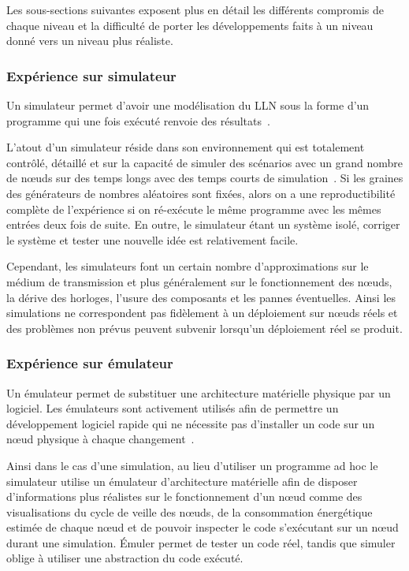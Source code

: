 Les sous-sections suivantes exposent plus en détail les différents compromis de chaque niveau et la difficulté de porter les développements faits à un niveau donné vers un niveau plus réaliste.

\subsubsection{Expérience sur simulateur}
\label{makesense:simulation}

Un simulateur permet d'avoir une modélisation du \ac{LLN} sous la forme d'un programme qui une fois exécuté renvoie des résultats~\cite{sobeih2006j,abdeddaim2011implementation}.

L'atout d'un simulateur réside dans son environnement qui est totalement contrôlé, détaillé et sur la capacité de simuler des scénarios avec un grand nombre de nœuds sur des temps longs avec des temps courts de simulation~\cite{jevtic2009evaluation}.
Si les graines des générateurs de nombres aléatoires sont fixées, alors on a une reproductibilité complète de l'expérience si on ré-exécute le même programme avec les mêmes entrées deux fois de suite.
En outre, le simulateur étant un système isolé, corriger le système et tester une nouvelle idée est relativement facile.

Cependant, les simulateurs font un certain nombre d'approximations sur le médium de transmission et plus généralement sur le fonctionnement des nœuds, la dérive des horloges, l'usure des composants et les pannes éventuelles.
Ainsi les simulations ne correspondent pas fidèlement à un déploiement sur nœuds réels et des problèmes non prévus peuvent subvenir lorsqu'un déploiement réel se produit.

\subsubsection{Expérience sur émulateur}
\label{makesense:emulation}

Un émulateur permet de substituer une architecture matérielle physique par un logiciel.
Les émulateurs sont activement utilisés afin de permettre un développement logiciel rapide qui ne nécessite pas d'installer un code sur un nœud physique à chaque changement~\cite{cooja}.

Ainsi dans le cas d'une simulation, au lieu d'utiliser un programme ad hoc le simulateur utilise un émulateur d'architecture matérielle afin de disposer d'informations plus réalistes sur le fonctionnement d'un nœud comme des visualisations du cycle de veille des nœuds, de la consommation énergétique estimée de chaque nœud et de pouvoir inspecter le code s’exécutant sur un nœud durant une simulation.
Émuler permet de tester un code réel, tandis que simuler oblige à utiliser une abstraction du code exécuté.

